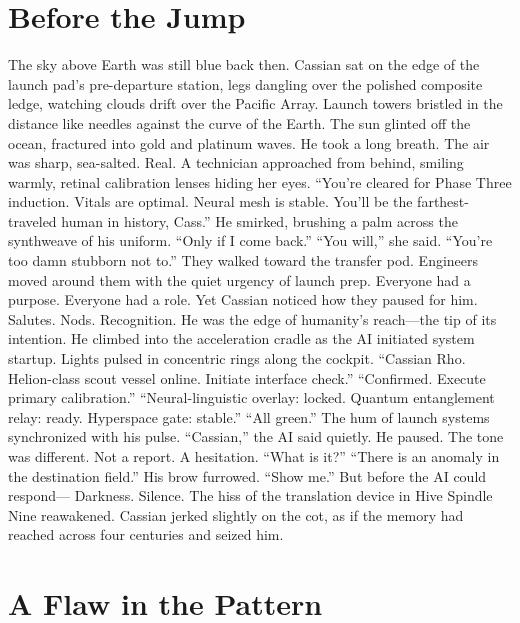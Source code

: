 \documentclass[12pt,oneside]{book}
\begin{document}

\chapter{Before the Jump}

The sky above Earth was still blue back then.
Cassian sat on the edge of the launch pad’s pre-departure station, legs dangling over the polished composite ledge, watching clouds drift over the Pacific Array. Launch towers bristled in the distance like needles against the curve of the Earth. The sun glinted off the ocean, fractured into gold and platinum waves.
He took a long breath. The air was sharp, sea-salted. Real.
A technician approached from behind, smiling warmly, retinal calibration lenses hiding her eyes.
“You’re cleared for Phase Three induction. Vitals are optimal. Neural mesh is stable. You’ll be the farthest-traveled human in history, Cass.”
He smirked, brushing a palm across the synthweave of his uniform. “Only if I come back.”
“You will,” she said. “You’re too damn stubborn not to.”
They walked toward the transfer pod. Engineers moved around them with the quiet urgency of launch prep. Everyone had a purpose. Everyone had a role. Yet Cassian noticed how they paused for him. Salutes. Nods. Recognition.
He was the edge of humanity’s reach—the tip of its intention.
He climbed into the acceleration cradle as the AI initiated system startup. Lights pulsed in concentric rings along the cockpit.
“Cassian Rho. Helion-class scout vessel online. Initiate interface check.”
“Confirmed. Execute primary calibration.”
“Neural-linguistic overlay: locked. Quantum entanglement relay: ready. Hyperspace gate: stable.”
“All green.”
The hum of launch systems synchronized with his pulse.
“Cassian,” the AI said quietly.
He paused. The tone was different. Not a report. A hesitation.
“What is it?”
“There is an anomaly in the destination field.”
His brow furrowed. “Show me.”
But before the AI could respond—
Darkness.
Silence.
The hiss of the translation device in Hive Spindle Nine reawakened.
Cassian jerked slightly on the cot, as if the memory had reached across four centuries and seized him.



\chapter{A Flaw in the Pattern}
\end{document}

